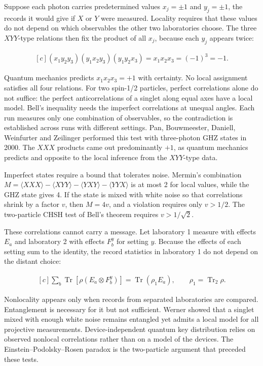 \documentclass[11pt,oneside]{book}
\newenvironment{centeredalign}{\[\begin{gathered}[c]}{\end{gathered}\]}
\begin{document}
Suppose each photon carries predetermined values \(x_j=\pm1\) and \(y_j=\pm1\), the records it would give if \(X\) or \(Y\) were measured. Locality requires that these values do not depend on which observables the other two laboratories choose. The three \(XYY\)-type relations then fix the product of all \(x_j\), because each \(y_j\) appears twice:

\begin{centeredalign}
(x_1y_2y_3)(y_1x_2y_3)(y_1y_2x_3)=x_1x_2x_3=(-1)^3=-1.
\end{centeredalign}

Quantum mechanics predicts \(x_1x_2x_3=+1\) with certainty. No local assignment satisfies all four relations. For two spin-1/2 particles, perfect correlations alone do not suffice: the perfect anticorrelations of a singlet along equal axes have a local model. Bell's inequality needs the imperfect correlations at unequal angles. Each run measures only one combination of observables, so the contradiction is established across runs with different settings. Pan, Bouwmeester, Daniell, Weinfurter and Zeilinger performed this test with three-photon GHZ states in 2000. The \(XXX\) products came out predominantly \(+1\), as quantum mechanics predicts and opposite to the local inference from the \(XYY\)-type data.

Imperfect states require a bound that tolerates noise. Mermin's combination \(M=\langle XXX\rangle-\langle XYY\rangle-\langle YXY\rangle-\langle YYX\rangle\) is at most 2 for local values, while the GHZ state gives 4. If the state is mixed with white noise so that correlations shrink by a factor \(v\), then \(M=4v\), and a violation requires only \(v>1/2\). The two-particle CHSH test of Bell's theorem requires \(v>1/\sqrt2\).

These correlations cannot carry a message. Let laboratory 1 measure with effects \(E_a\) and laboratory 2 with effects \(F_b^y\) for setting \(y\). Because the effects of each setting sum to the identity, the record statistics in laboratory 1 do not depend on the distant choice:

\begin{centeredalign}
\sum_b\operatorname{Tr}[\rho(E_a\otimes F^y_b)]=\operatorname{Tr}(\rho_1E_a),
\qquad \rho_1=\operatorname{Tr}_2\rho.
\end{centeredalign}

Nonlocality appears only when records from separated laboratories are compared. Entanglement is necessary for it but not sufficient. Werner showed that a singlet mixed with enough white noise remains entangled yet admits a local model for all projective measurements. Device-independent quantum key distribution relies on observed nonlocal correlations rather than on a model of the devices. The Einstein--Podolsky--Rosen paradox is the two-particle argument that preceded these tests.
\end{document}
